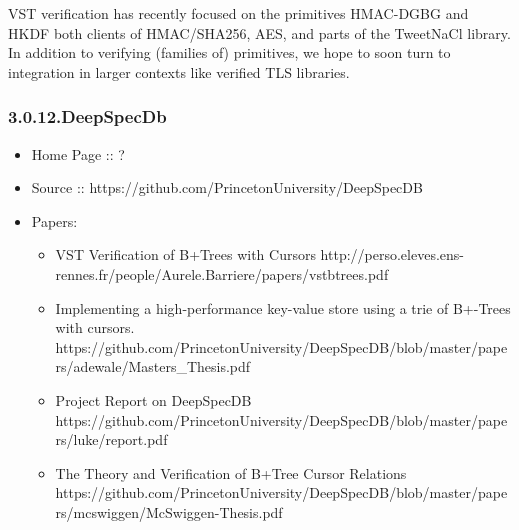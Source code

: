 \documentclass[12pt,twoside]{article}
\begin{document}
VST verification has recently focused on the primitives HMAC-DGBG and
HKDF \textendash{} both clients of HMAC/SHA256, AES, and parts of the TweetNaCl
library. In addition to verifying (families of) primitives, we hope to
soon turn to integration in larger contexts like verified TLS
libraries.%

\subsubsection{3.0.12.\hspace*{0.5em}DeepSpecDb}\label{sec-deepspecdb}%

\begin{itemize}[noitemsep,topsep=\mdcompacttopsep]%

\item{}Home Page :: ?%

\item{}Source :: https://github.com/PrincetonUniversity/DeepSpecDB%

\item{}Papers:

\begin{itemize}[noitemsep,topsep=\mdcompacttopsep]%

\item{}VST Verification of B+Trees with Cursors
http://perso.eleves.ens-rennes.fr/people/Aurele.Barriere/papers/vstbtrees.pdf%

\item{}Implementing a high-performance key-value store using a trie of
B+-Trees with cursors.
https://github.com/PrincetonUniversity/DeepSpecDB/blob/master/papers/adewale/Masters\_Thesis.pdf%

\item{}Project Report on DeepSpecDB
https://github.com/PrincetonUniversity/DeepSpecDB/blob/master/papers/luke/report.pdf%

\item{}The Theory and Verification of B+Tree Cursor Relations
https://github.com/PrincetonUniversity/DeepSpecDB/blob/master/papers/mcswiggen/McSwiggen-Thesis.pdf%
\end{itemize}%
\end{itemize}%
\end{document}
